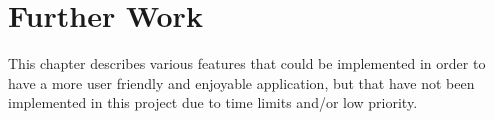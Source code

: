 \chapter{Further Work}

This chapter describes various features that could be implemented in order to have a 
more user friendly and enjoyable application, but that have not been implemented in 
this project due to time limits and/or low priority.